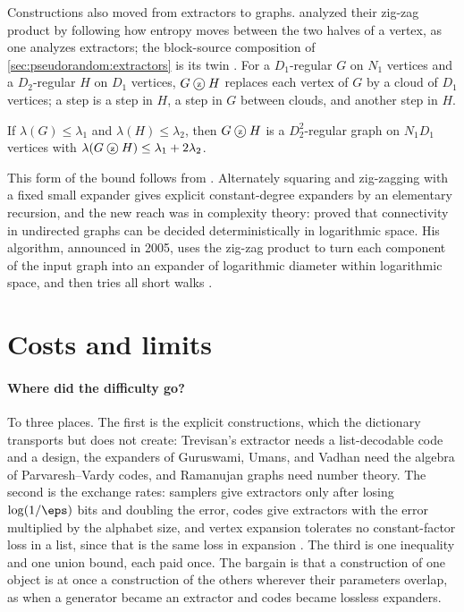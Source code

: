\begin{refsection}
Constructions also moved from extractors to graphs. \textcite{ReingoldVadhanWigderson2002} analyzed their zig-zag product by following how entropy moves between the two halves of a vertex, as one analyzes extractors; the block-source composition of \cref{sec:pseudorandom:extractors} is its twin \parencite[\S6.3.5]{Vadhan2012}. For a $D_1$-regular $G$ on $N_1$ vertices and a $D_2$-regular $H$ on $D_1$ vertices, $G\mathbin{\text{\textcircled{\scriptsize z}}} H$ replaces each vertex of $G$ by a cloud of $D_1$ vertices; a step is a step in $H$, a step in $G$ between clouds, and another step in $H$.

\begin{theorem}\label{thm:pseudorandom:zigzag}
If $\lambda(G)\le\lambda_1$ and $\lambda(H)\le\lambda_2$, then $G\mathbin{\text{\textcircled{\scriptsize z}}} H$ is a $D_2^2$-regular graph on $N_1D_1$ vertices with $\lambda(G\mathbin{\text{\textcircled{\scriptsize z}}} H)\le\lambda_1+2\lambda_2$.
\end{theorem}

This form of the bound follows from \textcite[Theorem~4.35]{Vadhan2012}. Alternately squaring and zig-zagging with a fixed small expander gives explicit constant-degree expanders by an elementary recursion, and the new reach was in complexity theory: \textcite{Reingold2008} proved that connectivity in undirected graphs can be decided deterministically in logarithmic space. His algorithm, announced in 2005, uses the zig-zag product to turn each component of the input graph into an expander of logarithmic diameter within logarithmic space, and then tries all short walks \parencite[\S4.4]{Vadhan2012}.

\section{Costs and limits}\label{sec:pseudorandom:costs}

\paragraph{Where did the difficulty go?} To three places. The first is the explicit constructions, which the dictionary transports but does not create: Trevisan's extractor needs a list-decodable code and a design, the expanders of Guruswami, Umans, and Vadhan need the algebra of Parvaresh--Vardy codes, and Ramanujan graphs need number theory. The second is the exchange rates: samplers give extractors only after losing $\log(1/\eps)$ bits and doubling the error, codes give extractors with the error multiplied by the alphabet size, and vertex expansion tolerates no constant-factor loss in a list, since that is the same loss in expansion \parencite[\S5.3]{Vadhan2012}. The third is one inequality and one union bound, each paid once. The bargain is that a construction of one object is at once a construction of the others wherever their parameters overlap, as when a generator became an extractor and codes became lossless expanders.


\end{refsection}

